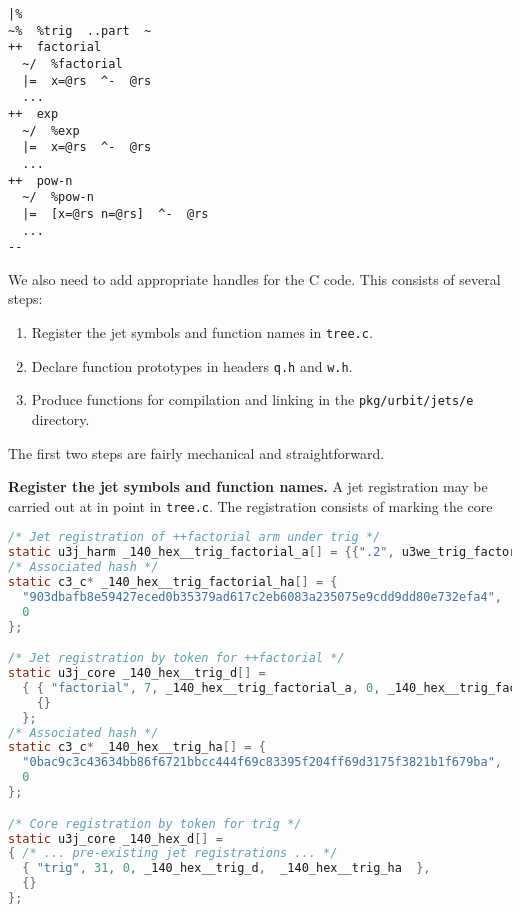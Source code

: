 \begin{example}
\begin{lstlisting}[caption={Jet hints in \texttt{lib/trig-rs.hoon}},
                   style=nonumbers]
|%
~%  %trig  ..part  ~
++  factorial
  ~/  %factorial
  |=  x=@rs  ^-  @rs
  ...
++  exp
  ~/  %exp
  |=  x=@rs  ^-  @rs
  ...
++  pow-n
  ~/  %pow-n
  |=  [x=@rs n=@rs]  ^-  @rs
  ...
--
\end{lstlisting}

We also need to add appropriate handles for the C code.  This consists of several steps:

\begin{enumerate}
  \item  Register the jet symbols and function names in \texttt{tree.c}.
  \item  Declare function prototypes in headers \texttt{q.h} and \texttt{w.h}.
  \item  Produce functions for compilation and linking in the \texttt{pkg/urbit/jets/e} directory.
\end{enumerate}

The first two steps are fairly mechanical and straightforward.

\textbf{Register the jet symbols and function names.}  A jet registration may be carried out at in point in \texttt{tree.c}.  The registration consists of marking the core

\begin{lstlisting}[language=C,
                   caption={Additions to \texttt{pkg/urbit/jets/tree.c}}]
/* Jet registration of ++factorial arm under trig */
static u3j_harm _140_hex__trig_factorial_a[] = {{".2", u3we_trig_factorial, c3y}, {}};
/* Associated hash */
static c3_c* _140_hex__trig_factorial_ha[] = {
  "903dbafb8e59427eced0b35379ad617c2eb6083a235075e9cdd9dd80e732efa4",
  0
};

/* Jet registration by token for ++factorial */
static u3j_core _140_hex__trig_d[] =
  { { "factorial", 7, _140_hex__trig_factorial_a, 0, _140_hex__trig_factorial_ha },
    {}
  };
/* Associated hash */
static c3_c* _140_hex__trig_ha[] = {
  "0bac9c3c43634bb86f6721bbcc444f69c83395f204ff69d3175f3821b1f679ba",
  0
};

/* Core registration by token for trig */
static u3j_core _140_hex_d[] =
{ /* ... pre-existing jet registrations ... */
  { "trig", 31, 0, _140_hex__trig_d,  _140_hex__trig_ha  },
  {}
};
\end{lstlisting}



\end{example}
